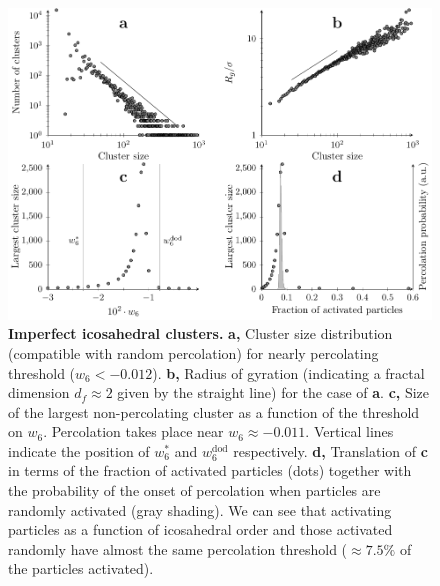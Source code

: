 \begin{figure}
\begin{center}

\includegraphics{generate_figures-figure7.pdf}
\end{center}
	\caption{\textbf{Imperfect icosahedral clusters.} \textbf{a,} Cluster size distribution (compatible with random percolation) for nearly percolating threshold ($w_6<-0.012$). 
\textbf{b,} Radius of gyration (indicating a fractal dimension $d_f\approx 2$ given by the straight line) for the case of {\bf a}. \textbf{c,} Size of the largest non-percolating cluster as a function of the threshold on $w_6$. Percolation takes place near $w_6\approx -0.011$. Vertical lines indicate the position of $w_6^*$ and $w_6^\text{dod}$ respectively. \textbf{d,} Translation of \textbf{c} in terms of the fraction of activated particles (dots) together with the probability of the onset of percolation when particles are randomly activated (gray shading). We can see that activating particles as a function of icosahedral order and those activated randomly have almost the same percolation threshold ($\approx7.5\%$ of the particles activated).}
	\label{fig:percolation}
\end{figure}
\clearpage

